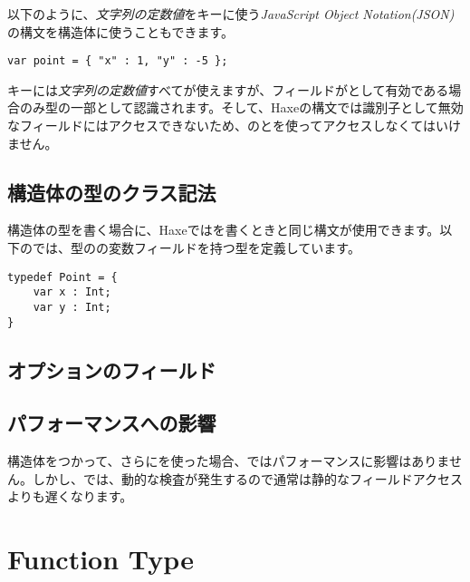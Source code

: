 以下のように、\emph{文字列の定数値}をキーに使う\emph{JavaScript Object Notation(JSON)}の構文を構造体に使うこともできます。

\begin{lstlisting}
var point = { "x" : 1, "y" : -5 };
\end{lstlisting}

キーには\emph{文字列の定数値}すべてが使えますが、フィールドがとして有効である場合のみ型の一部として認識されます。そして、Haxeの構文では識別子として無効なフィールドにはアクセスできないため、のとを使ってアクセスしなくてはいけません。

\subsection{構造体の型のクラス記法}
\label{types-structure-class-notation}

構造体の型を書く場合に、Haxeではを書くときと同じ構文が使用できます。以下のでは、型のの変数フィールドを持つ型を定義しています。

\begin{lstlisting}
typedef Point = {
    var x : Int;
    var y : Int;
}
\end{lstlisting}

\subsection{オプションのフィールド}
\label{types-structure-optional-fields}


\subsection{パフォーマンスへの影響}
\label{types-structure-performance}

構造体をつかって、さらにを使った場合、ではパフォーマンスに影響はありません。しかし、では、動的な検査が発生するので通常は静的なフィールドアクセスよりも遅くなります。



\section{Function Type}
\label{types-function}

